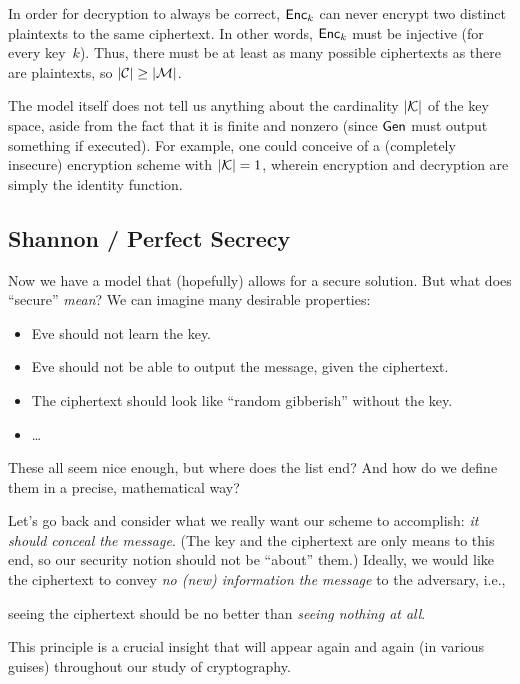 \documentclass[11pt]{article}
\begin{document}
\begin{answer}
  In order for decryption to always be correct, \(\mathsf{Enc}_k\) can
  never encrypt two distinct plaintexts to the same ciphertext. In
  other words, \(\mathsf{Enc}_k\) must be injective (for every
  key~$k$). Thus, there must be at least as many possible ciphertexts
  as there are plaintexts, so \(\lvert\mathcal{C}\rvert \geq \lvert\mathcal{M}\rvert\).
  
  The model itself does not tell us anything about the cardinality
  \( \lvert\mathcal{K}\rvert\) of the key space, aside from the fact that it
  is finite and nonzero (since \(\mathsf{Gen}\) must output something if
  executed). For example, one could conceive of a (completely
  insecure) encryption scheme with \(\lvert\mathcal{K}\rvert = 1\), wherein
  encryption and decryption are simply the identity function.
\end{answer}

\subsection{Shannon / Perfect Secrecy}
\label{sec:shannon-perfect-secrecy}

Now we have a model that (hopefully) allows for a secure solution.
But what does ``secure'' \emph{mean}?  We can imagine many desirable
properties:
\begin{itemize}
\item Eve should not learn the key.
\item Eve should not be able to output the message, given the
  ciphertext.
\item The ciphertext should look like ``random gibberish'' without the
  key.
\item \ldots
\end{itemize}
These all seem nice enough, but where does the list end?  And how do
we define them in a precise, mathematical way?

Let's go back and consider what we really want our scheme to
accomplish: \emph{it should conceal the message}.  (The key and the
ciphertext are only means to this end, so our security notion should
not be ``about'' them.)  Ideally, we would like the ciphertext to
convey \emph{no (new) information the message} to the adversary, i.e.,
\begin{center}
  seeing the ciphertext should be no better than \emph{seeing nothing
    at all}.
\end{center}
This principle is a crucial insight that will appear again and again
(in various guises) throughout our study of cryptography.
\end{document}
